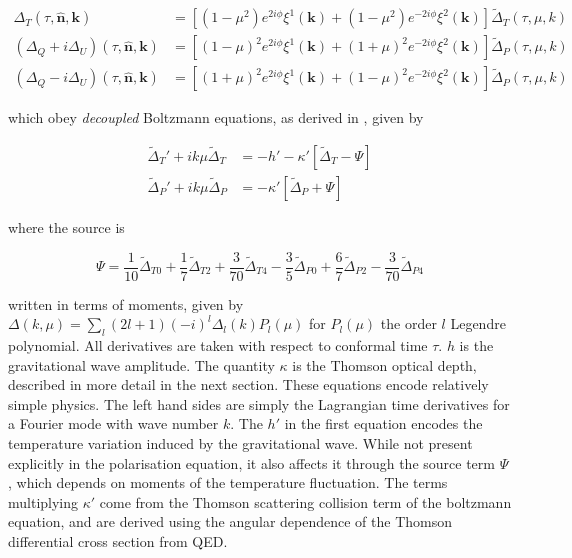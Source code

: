 \documentclass[a4paper,10pt]{article}
\renewcommand{\v}[1]{\mathbf{#1}}
\newcommand{\unit}[1]{\hat{\v{#1}}}
\begin{document}
\begin{equation}\begin{split}
\Delta_T(\tau,\unit{n},\v{k}) &= [(1-\mu^2) e^{2i\phi} \xi^1(\v{k})+(1-\mu^2) e^{-2i\phi} \xi^2(\v{k})]\tilde{\Delta}_T(\tau,\mu,k)\\
(\Delta_Q+i\Delta_U)(\tau,\unit{n},\v{k}) &=[(1-\mu)^2 e^{2i\phi} \xi^1(\v{k})+(1+\mu)^2 e^{-2i\phi} \xi^2(\v{k})]\tilde{\Delta}_P(\tau,\mu,k) \\
(\Delta_Q-i\Delta_U)(\tau,\unit{n},\v{k}) &=[(1+\mu)^2 e^{2i\phi} \xi^1(\v{k})+(1-\mu)^2 e^{-2i\phi} \xi^2(\v{k})]\tilde{\Delta}_P(\tau,\mu,k)
\end{split}\end{equation}

which obey \textit{decoupled} Boltzmann equations, as derived in \cite{Kowosky}, given by

\begin{equation}\begin{split}
\tilde{\Delta}_T'+ik\mu \tilde{\Delta}_T &= -h' -\kappa'[\tilde{\Delta}_T - \Psi]\\
\tilde{\Delta}_P'+ik\mu\tilde{\Delta}_P &= -\kappa'[\tilde{\Delta}_P + \Psi]
\end{split}
\label{Boltzmann}\end{equation}

where the source is

\begin{equation}
\Psi = \frac{1}{10}\tilde{\Delta}_{T0} + \frac{1}{7}\tilde{\Delta}_{T2} + \frac{3}{70}\tilde{\Delta}_{T4} - \frac{3}{5}\tilde{\Delta}_{P0} + \frac{6}{7}\tilde{\Delta}_{P2} - \frac{3}{70}\tilde{\Delta}_{P4}
\end{equation}

written in terms of moments, given by $\Delta(k, \mu) = \sum_l (2l+1)(-i)^l\Delta_l(k)P_l(\mu)$ for $P_l(\mu)$ the order $l$ Legendre polynomial. All derivatives are taken with respect to conformal time $\tau$. $h$ is the gravitational wave amplitude. The quantity $\kappa$ is the Thomson optical depth, described in more detail in the next section. These equations encode relatively simple physics. The left hand sides are simply the Lagrangian time derivatives for a Fourier mode with wave number $k$. The $h'$ in the first equation encodes the temperature variation induced by the gravitational wave. While not present explicitly in the polarisation equation, it also affects it through the source term $\Psi$, which depends on moments of the temperature fluctuation. The terms multiplying $\kappa'$ come from the Thomson scattering collision term of the boltzmann equation, and are derived using the angular dependence of the Thomson differential cross section from QED. \\
\end{document}
